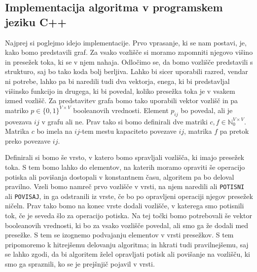 \documentclass[mat1]{fmfdelo}
\newcommand{\N}{\mathbb N}
\begin{document}

\subsection{Implementacija algoritma v programskem jeziku C++}

Najprej si poglejmo idejo implementacije. Prvo vprasanje, ki se nam postavi, je, kako bomo predstavili graf. Za vsako vozlišče si moramo zapomniti njegovo višino in presežek toka, ki se v njem nahaja. Odločimo se, da bomo vozlišče predstavili s strukturo, saj bo tako koda bolj berljiva. Lahko bi sicer uporabili razred, vendar ni potrebe, lahko pa bi naredili tudi dva vektorja, enega, ki bi predstavljal višinsko funkcijo in drugega, ki bi povedal, koliko presežka toka je v vsakem izmed vozlišč. Za predstavitev grafa bomo tako uporabili vektor vozlišč in pa matriko $p\in \{0,1\}^{V \times V}$ booleanovih vrednosti. Element $p_{ij}$ bo povedal, ali je povezava $ij$ v grafu ali ne. Prav tako si bomo definirali dve matriki $c, f \in \N_0^{V \times V}$. Matrika $c$ bo imela na $ij$-tem mestu kapaciteto povezave $ij$, matrika $f$ pa pretok preko povezave $ij$.

Definirali si bomo še vrsto, v katero bomo spravljali vozlišča, ki imajo presežek toka. S tem bomo lahko do elementov, na katerih moramo opraviti še operacijo potiska ali povišanja dostopali v konstantnem času, algoritem pa bo deloval pravilno. Vzeli bomo namreč prvo vozlišče v vrsti, na njem naredili ali \texttt{POTISNI} ali \texttt{POVISAJ}, in ga odstranili iz vrste, če bo po opravljeni operaciji njegov presežek ničeln. Prav tako bomo na konec vrste dodali vozlišče, v katerega smo potisnili tok, če je seveda šlo za operacijo potiska. Na tej točki bomo potrebovali še vektor booleanovih vrednosti, ki bo za vsako vozlišče povedal, ali smo ga že dodali med presežke. S tem se izognemo podvajanju elementov v vrsti presežkov. S tem pripomoremo k hitrejšemu delovanju algoritma; in hkrati tudi pravilnejšemu, saj se lahko zgodi, da bi algoritem želel opravljati potisk ali povišanje na vozlišču, ki smo ga spraznili, ko se je prejšnjič pojavil v vrsti.
\end{document}
